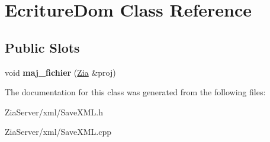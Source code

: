 \hypertarget{class_ecriture_dom}{
\section{EcritureDom Class Reference}
\label{class_ecriture_dom}
}
\subsection*{Public Slots}
\begin{DoxyCompactItemize}
\item 
\hypertarget{class_ecriture_dom_a87f7c942f08de38d8f00850553d658e7}{
void {\bfseries maj\_\-fichier} (\hyperlink{class_zia}{Zia} \&proj)}
\label{class_ecriture_dom_a87f7c942f08de38d8f00850553d658e7}

\end{DoxyCompactItemize}


The documentation for this class was generated from the following files:\begin{DoxyCompactItemize}
\item 
ZiaServer/xml/SaveXML.h\item 
ZiaServer/xml/SaveXML.cpp\end{DoxyCompactItemize}
